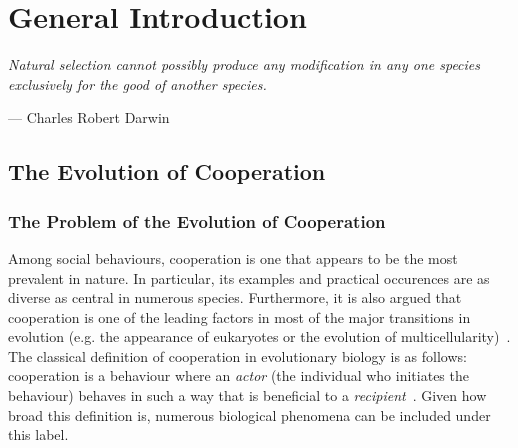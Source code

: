 \chapter{General Introduction}

\epigraph{\textit{Natural selection cannot possibly produce any modification in any one species exclusively for the good of another species.}}{--- \textup{Charles Robert Darwin}}

\minitoc[n] %


\section{The Evolution of Cooperation}

  \subsection{The Problem of the Evolution of Cooperation}

    Among social behaviours, cooperation is one that appears to be the most prevalent in nature. In particular, its examples and practical occurences are as diverse as central in numerous species. Furthermore, it is also argued that cooperation is one of the leading factors in most of the major transitions in evolution (e.g. the appearance of eukaryotes or the evolution of multicellularity)~\parencite{Szathmary1995}. The classical definition of cooperation in evolutionary biology is as follows: cooperation is a behaviour where an \emph{actor} (the individual who initiates the behaviour) behaves in such a way that is beneficial to a \emph{recipient}~\parencite{West2007a}. Given how broad this definition is, numerous biological phenomena can be included under this label. 

